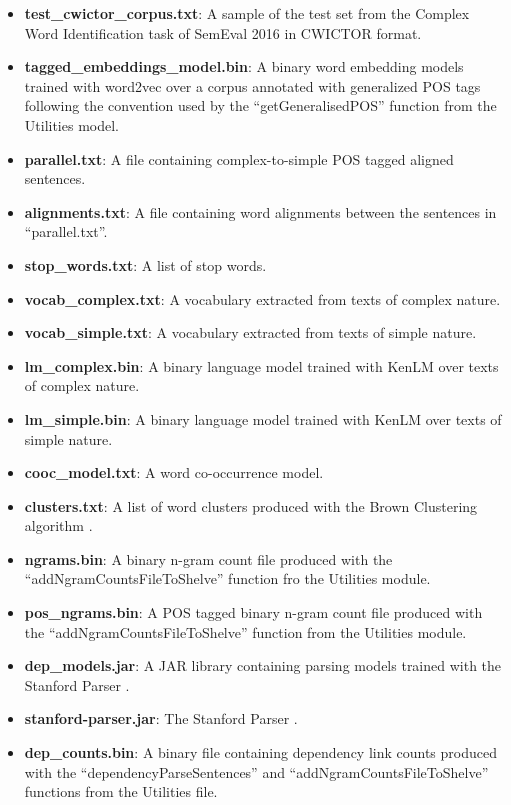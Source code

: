 \begin{itemize}
	\item \textbf{test\_cwictor\_corpus.txt}:  A sample of the test set from the Complex Word Identification task of SemEval 2016 \cite{Paetzold2016SemEval} in CWICTOR format.
	
	\item \textbf{tagged\_embeddings\_model.bin}: A binary word embedding models trained with word2vec \cite{mikolov2013efficient} over a corpus annotated with generalized POS tags following the convention used by the ``getGeneralisedPOS'' function from the Utilities model.
	
	\item \textbf{parallel.txt}: A file containing complex-to-simple POS tagged aligned sentences.
	
	\item \textbf{alignments.txt}: A file containing word alignments between the sentences in ``parallel.txt''.
	
	\item \textbf{stop\_words.txt}: A list of stop words.
	
	\item \textbf{vocab\_complex.txt}: A vocabulary extracted from texts of complex nature.
	
	\item \textbf{vocab\_simple.txt}: A vocabulary extracted from texts of simple nature.
	
	\item \textbf{lm\_complex.bin}: A binary language model trained with KenLM \cite{kenlm} over texts of complex nature.
	
	\item \textbf{lm\_simple.bin}: A binary language model trained with KenLM \cite{kenlm} over texts of simple nature.
	
	\item \textbf{cooc\_model.txt}: A word co-occurrence model.
	
	\item \textbf{clusters.txt}: A list of word clusters produced with the Brown Clustering algorithm \cite{brownclusters}.
	
	\item \textbf{ngrams.bin}: A binary n-gram count file produced with the ``addNgramCountsFileToShelve'' function fro the Utilities module.
	
	\item \textbf{pos\_ngrams.bin}: A POS tagged binary n-gram count file produced with the ``addNgramCountsFileToShelve'' function from the Utilities module.
	
	\item \textbf{dep\_models.jar}: A JAR library containing parsing models trained with the Stanford Parser \cite{stanfordparser}.
	
	\item \textbf{stanford-parser.jar}: The Stanford Parser \cite{stanfordparser}.
	
	\item \textbf{dep\_counts.bin}: A binary file containing dependency link counts produced with the ``dependencyParseSentences'' and ``addNgramCountsFileToShelve'' functions from the Utilities file.
\end{itemize}

